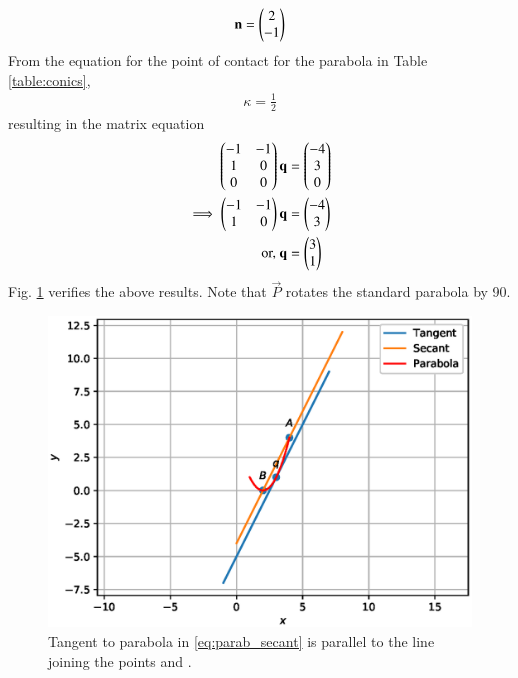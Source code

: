 \begin{enumerate}[label=\thesection.\arabic*.,ref=\thesection.\theenumi]
\begin{align}
\mathbf{n} =  \begin{pmatrix}2\\-1\end{pmatrix}
\label{eq:parab_secant_twovar_n}
\end{align}
From the equation for the point of contact for the  parabola  in Table \ref{table:conics},
\begin{align}
\kappa = \frac{1}{2}
\end{align}
resulting in the matrix equation
\begin{align}
\begin{pmatrix}-1 & -1\\1 & 0\\0&0\end{pmatrix}\mathbf{q} &= \begin{pmatrix}-4\\3\\0\end{pmatrix}
\\
\implies \begin{pmatrix}-1 & -1\\1 & 0\end{pmatrix}\mathbf{q} &= \begin{pmatrix}-4\\3\end{pmatrix}
\\
\text{or, } \mathbf{q} &= \begin{pmatrix}3\\1\end{pmatrix}
\end{align}
Fig. \ref{fig:parab_secant_tangent}	verifies the above results.  Note that $\vec{P}$ rotates the standard parabola by 90\degree.
%
\begin{figure}[!ht]
\centering
\includegraphics[width=\columnwidth]{./figs/parab/parab_tangent_secant.eps}
\caption{Tangent to  parabola in \eqref{eq:parab_secant}  is parallel to the line joining the points  and . }
\label{fig:parab_secant_tangent}	
\end{figure}

\end{enumerate}
